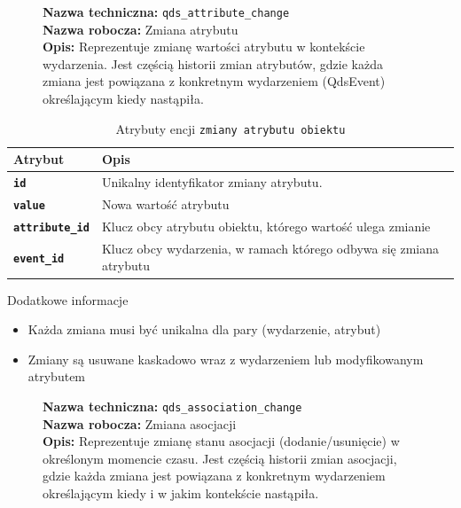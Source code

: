 \begin{figure}[H]
    \centering
    \begin{minipage}{0.8\textwidth}
        \begin{framed}
            \noindent\textbf{\large Nazwa techniczna:} \texttt{qds\_attribute\_change} \\
            \textbf{\large Nazwa robocza:} Zmiana atrybutu \\
            \textbf{\large Opis:} Reprezentuje zmianę wartości atrybutu w kontekście wydarzenia.
            Jest częścią historii zmian atrybutów, gdzie każda zmiana jest powiązana
            z konkretnym wydarzeniem (QdsEvent) określającym kiedy nastąpiła.
        \end{framed}
    \end{minipage}
\end{figure}

\begin{table}[H]
    \centering
    \renewcommand{\arraystretch}{1.6}
    \begin{tabular}{|>{\bfseries}l|p{}|}
        \hline
        \rowcolor[HTML]{EFEFEF} \textbf{Atrybut} & \textbf{Opis} \\
        \hline
        \texttt{id} & Unikalny identyfikator zmiany atrybutu. \\
        \hline
        \texttt{value} & Nowa wartość atrybutu \\
        \hline
        \texttt{attribute\_id} & Klucz obcy atrybutu obiektu, którego wartość ulega zmianie \\
        \hline
        \texttt{event\_id} & Klucz obcy wydarzenia, w ramach którego odbywa się zmiana atrybutu \\
        \hline
    \end{tabular}
    \caption{Atrybuty encji \texttt{zmiany atrybutu obiektu}}
\end{table}

Dodatkowe informacje
\begin{itemize}
    \item Każda zmiana musi być unikalna dla pary (wydarzenie, atrybut)
    \item Zmiany są usuwane kaskadowo wraz z wydarzeniem lub modyfikowanym atrybutem
\end{itemize}

\begin{figure}[H]
    \centering
    \begin{minipage}{0.8\textwidth}
        \begin{framed}
            \noindent\textbf{\large Nazwa techniczna:} \texttt{qds\_association\_change} \\
            \textbf{\large Nazwa robocza:} Zmiana asocjacji \\
            \textbf{\large Opis:} Reprezentuje zmianę stanu asocjacji (dodanie/usunięcie) w określonym momencie czasu.
            Jest częścią historii zmian asocjacji, gdzie każda zmiana jest powiązana z konkretnym
            wydarzeniem określającym kiedy i w jakim kontekście nastąpiła.
        \end{framed}
    \end{minipage}
\end{figure}

